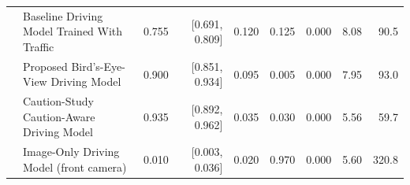 \begin{tabular}{@{}llrrrrrrr@{}}
 & Baseline Driving Model Trained With Traffic & 0.755 & [0.691, 0.809] & 0.120 & 0.125 & 0.000 & 8.08 & 90.5\\
 & Proposed Bird's-Eye-View Driving Model & 0.900 & [0.851, 0.934] & 0.095 & 0.005 & 0.000 & 7.95 & 93.0\\
 & Caution-Study Caution-Aware Driving Model & 0.935 & [0.892, 0.962] & 0.035 & 0.030 & 0.000 & 5.56 & 59.7\\
 & Image-Only Driving Model (front camera) & 0.010 & [0.003, 0.036] & 0.020 & 0.970 & 0.000 & 5.60 & 320.8\\
\bottomrule\end{tabular}
